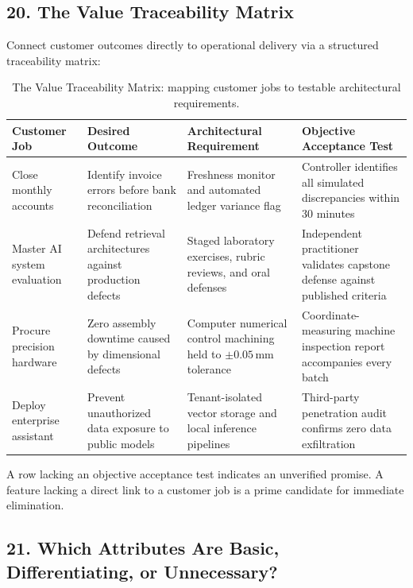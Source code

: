 \subsection*{20. The Value Traceability Matrix}

Connect customer outcomes directly to operational delivery via a structured traceability matrix:

\begin{table}[t]
\centering
\small
\begin{tabularx}{\textwidth}{>{\raggedright\arraybackslash}p{3.2cm} >{\raggedright\arraybackslash}p{3.8cm} >{\raggedright\arraybackslash}p{4cm} >{\raggedright\arraybackslash}X}
\toprule
\textbf{Customer Job} & \textbf{Desired Outcome} & \textbf{Architectural Requirement} & \textbf{Objective Acceptance Test} \\
\midrule
Close monthly accounts & Identify invoice errors before bank reconciliation & Freshness monitor and automated ledger variance flag & Controller identifies all simulated discrepancies within 30 minutes \\
Master AI system evaluation & Defend retrieval architectures against production defects & Staged laboratory exercises, rubric reviews, and oral defenses & Independent practitioner validates capstone defense against published criteria \\
Procure precision hardware & Zero assembly downtime caused by dimensional defects & Computer numerical control machining held to $\pm 0.05$\,mm tolerance & Coordinate-measuring machine inspection report accompanies every batch \\
Deploy enterprise assistant & Prevent unauthorized data exposure to public models & Tenant-isolated vector storage and local inference pipelines & Third-party penetration audit confirms zero data exfiltration \\
\bottomrule
\end{tabularx}
\caption{The Value Traceability Matrix: mapping customer jobs to testable architectural requirements.}
\label{tab:ch10-traceability-matrix}
\end{table}

A row lacking an objective acceptance test indicates an unverified promise. A feature lacking a direct link to a customer job is a prime candidate for immediate elimination.

\subsection*{21. Which Attributes Are Basic, Differentiating, or Unnecessary?}

